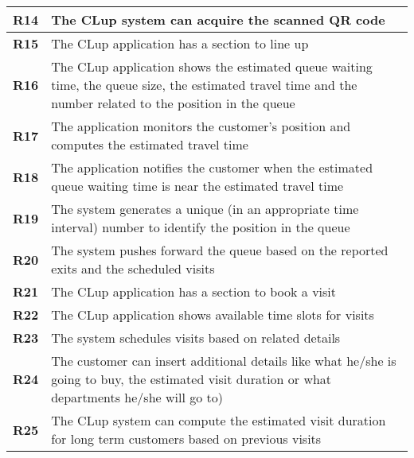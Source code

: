 \begin{center}
{\begin{longtable}{L{2cm}L{12cm}}
            \hline
            \textbf{R14} & The CLup system can acquire the scanned QR code \\
            \hline
            \textbf{R15} & The CLup application has a section to line up \\
            \hline
            \textbf{R16} & The CLup application shows the estimated queue waiting time, the queue size, the estimated travel time and the number related to the position in the queue \\
            \hline
            \textbf{R17} & The application monitors the customer's position and computes the estimated travel time \\
            \hline
            \textbf{R18} & The application notifies the customer when the estimated queue waiting time is near the estimated travel time \\
            \hline
            \textbf{R19} & The system generates a unique (in an appropriate time interval) number to identify the position in the queue \\
            \hline
            \textbf{R20} & The system pushes forward the queue based on the reported exits and the scheduled visits \\
            \hline
            \textbf{R21} & The CLup application has a section to book a visit \\
            \hline
            \textbf{R22} & The CLup application shows available time slots for visits \\
            \hline
            \textbf{R23} & The system schedules visits based on related details \\
            \hline
            \textbf{R24} & The customer can insert additional details like what he/she is going to buy, the estimated visit duration or what departments he/she will go to) \\
            \hline
            \textbf{R25} & The CLup system can compute the estimated visit duration for long term customers based on previous visits \\
            \hline
        \end{longtable}}
    \end{center}

